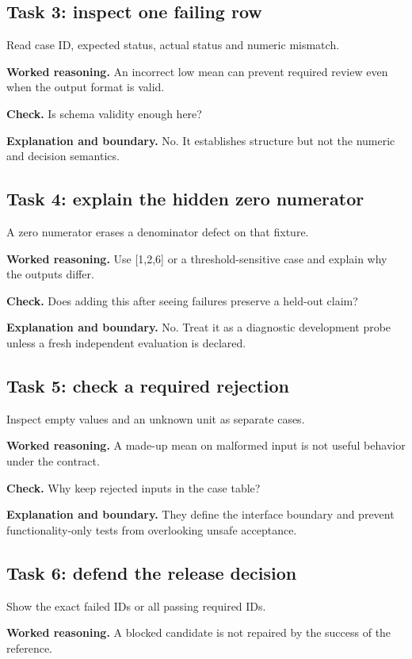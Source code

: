 \subsection{Task 3: inspect one failing row}
Read case ID, expected status, actual status and numeric mismatch.

\textbf{Worked reasoning.} An incorrect low mean can prevent required review even when the output format is valid.

\textbf{Check.} Is schema validity enough here?

\textbf{Explanation and boundary.} No. It establishes structure but not the numeric and decision semantics.

\subsection{Task 4: explain the hidden zero numerator}
A zero numerator erases a denominator defect on that fixture.

\textbf{Worked reasoning.} Use [1,2,6] or a threshold-sensitive case and explain why the outputs differ.

\textbf{Check.} Does adding this after seeing failures preserve a held-out claim?

\textbf{Explanation and boundary.} No. Treat it as a diagnostic development probe unless a fresh independent evaluation is declared.

\subsection{Task 5: check a required rejection}
Inspect empty values and an unknown unit as separate cases.

\textbf{Worked reasoning.} A made-up mean on malformed input is not useful behavior under the contract.

\textbf{Check.} Why keep rejected inputs in the case table?

\textbf{Explanation and boundary.} They define the interface boundary and prevent functionality-only tests from overlooking unsafe acceptance.

\subsection{Task 6: defend the release decision}
Show the exact failed IDs or all passing required IDs.

\textbf{Worked reasoning.} A blocked candidate is not repaired by the success of the reference.

